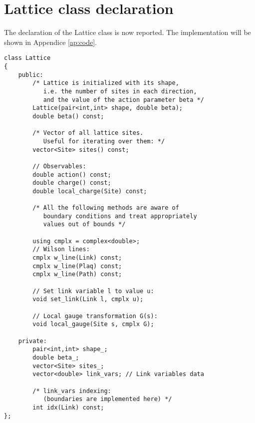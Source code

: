 \section{Lattice class declaration}

The declaration of the {\ttfamily Lattice} class is now reported.
The implementation will be shown in Appendice \ref{ap:code}.

\begin{lstlisting}[caption={Lattice class}]
class Lattice
{
    public:
        /* Lattice is initialized with its shape,
           i.e. the number of sites in each direction,
           and the value of the action parameter beta */
        Lattice(pair<int,int> shape, double beta);
        double beta() const; 

        /* Vector of all lattice sites.
           Useful for iterating over them: */
        vector<Site> sites() const;

        // Observables:
        double action() const;
        double charge() const;
        double local_charge(Site) const; 

        /* All the following methods are aware of
           boundary conditions and treat appropriately
           values out of bounds */

        using cmplx = complex<double>;
        // Wilson lines:
        cmplx w_line(Link) const;
        cmplx w_line(Plaq) const;
        cmplx w_line(Path) const;

        // Set link variable l to value u:
        void set_link(Link l, cmplx u); 

        // Local gauge transformation G(s):
        void local_gauge(Site s, cmplx G);
        
    private:
        pair<int,int> shape_;
        double beta_;
        vector<Site> sites_;
        vector<double> link_vars; // Link variables data

        /* link_vars indexing:
           (boundaries are implemented here) */
        int idx(Link) const;
};
\end{lstlisting}

